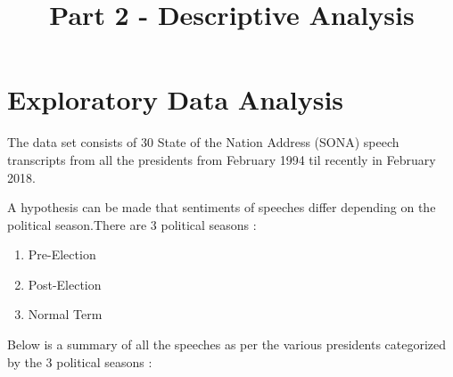 \documentclass[]{article}
\title{Part 2 - Descriptive Analysis}
\author{}
\date{}
\begin{document}
\maketitle

\section{Exploratory Data Analysis}

The data set consists of 30 State of the Nation Address (SONA) speech
transcripts from all the presidents from February 1994 til recently in
February 2018.

A hypothesis can be made that sentiments of speeches differ depending on
the political season.There are 3 political seasons :

\begin{enumerate}
\item Pre-Election
\item Post-Election
\item Normal Term
\end{enumerate}

Below is a summary of all the speeches as per the various presidents
categorized by the 3 political seasons :
\end{document}
